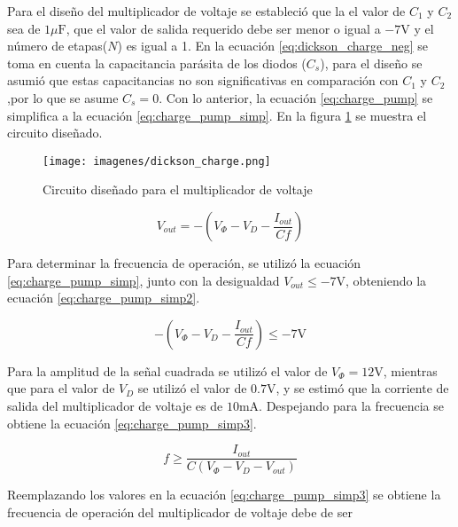     Para el diseño del multiplicador de voltaje se estableció que la 
    el valor de $C_1$ y $C_2$ sea de
    $1\mu\text{F}$, que el valor de salida requerido debe ser menor o igual
    a $-7\text{V}$ y el número de etapas($N$) es igual a 1. En la 
    ecuación \ref{eq:dickson_charge_neg}  se toma en cuenta la
    capacitancia parásita de los diodos ($C_s$), para el diseño se asumió
    que estas capacitancias no son significativas en comparación con 
    $C_1$ y $C_2$,por lo que se asume $C_s = 0$.
    Con lo anterior, la ecuación \ref{eq:charge_pump} se simplifica a la
    ecuación \ref{eq:charge_pump_simp}. En la figura \ref{fig:charge_pump_dis}
    se muestra el circuito diseñado.

    \begin{figure}[H]
        \centering
        \texttt{[image: imagenes/dickson\_charge.png]}
        \caption{Circuito diseñado para el multiplicador de voltaje}
        \label{fig:charge_pump_dis}
    \end{figure}

    \begin{equation}
        V_{out} = -\left(V_\Phi - V_D - \frac{I_{out}}{Cf}  \right)
        \label{eq:charge_pump_simp}
    \end{equation}

    Para determinar la frecuencia de operación, se utilizó la ecuación 
    \ref{eq:charge_pump_simp}, junto con la desigualdad 
    $V_{out} \leq -7\text{V}$, obteniendo la ecuación 
    \ref{eq:charge_pump_simp2}.

    \begin{equation}
        -\left(V_\Phi - V_D - \frac{I_{out}}{Cf}\right) \leq -7\text{V}
        \label{eq:charge_pump_simp2}    
    \end{equation}

    Para la amplitud de la señal cuadrada se utilizó el valor de 
    $V_\Phi = 12 \text{V}$, mientras que para 
    el valor de $V_D$ se utilizó el valor de $0.7\text{V}$, y se estimó que
    la corriente de salida del multiplicador de voltaje es de $10\text{mA}$.
    Despejando para la frecuencia se obtiene la ecuación \ref{eq:charge_pump_simp3}.

    \begin{equation}
        f \geq \frac{I_{out}}{C(V_\Phi - V_D - V_{out})}
        \label{eq:charge_pump_simp3}
    \end{equation}

    Reemplazando los valores en la ecuación \ref{eq:charge_pump_simp3} se obtiene
    la frecuencia de operación del multiplicador de voltaje debe de ser 

